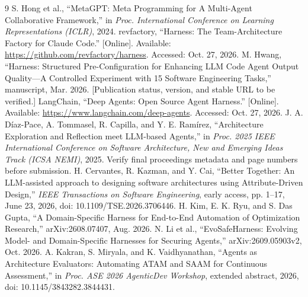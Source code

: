 \documentclass[10pt,conference]{IEEEtran}
\begin{document}
\begin{thebibliography}{9}
 S. Hong et al., ``MetaGPT: Meta Programming for A Multi-Agent Collaborative Framework,'' in \emph{Proc. International Conference on Learning Representations (ICLR)}, 2024.
 revfactory, ``Harness: The Team-Architecture Factory for Claude Code.'' [Online]. Available: \url{https://github.com/revfactory/harness}. Accessed: Oct. 27, 2026.
 M. Hwang, ``Harness: Structured Pre-Configuration for Enhancing LLM Code Agent Output Quality---A Controlled Experiment with 15 Software Engineering Tasks,'' manuscript, Mar. 2026. [Publication status, version, and stable URL to be verified.]
 LangChain, ``Deep Agents: Open Source Agent Harness.'' [Online]. Available: \url{https://www.langchain.com/deep-agents}. Accessed: Oct. 27, 2026.
 J. A. D\'iaz-Pace, A. Tommasel, R. Capilla, and Y. E. Ram\'irez, ``Architecture Exploration and Reflection meet LLM-based Agents,'' in \emph{Proc. 2025 IEEE International Conference on Software Architecture, New and Emerging Ideas Track (ICSA NEMI)}, 2025. Verify final proceedings metadata and page numbers before submission.
 H. Cervantes, R. Kazman, and Y. Cai, ``Better Together: An LLM-assisted approach to designing software architectures using Attribute-Driven Design,'' \emph{IEEE Transactions on Software Engineering}, early access, pp. 1--17, June 23, 2026, doi: 10.1109/TSE.2026.3706446.
 H. Kim, E. K. Ryu, and S. Das Gupta, ``A Domain-Specific Harness for End-to-End Automation of Optimization Research,'' arXiv:2608.07407, Aug. 2026.
 N. Li et al., ``EvoSafeHarness: Evolving Model- and Domain-Specific Harnesses for Securing Agents,'' arXiv:2609.05903v2, Oct. 2026.
 A. Kakran, S. Miryala, and K. Vaidhyanathan, ``Agents as Architecture Evaluators: Automating ATAM and SAAM for Continuous Assessment,'' in \emph{Proc. ASE 2026 AgenticDev Workshop}, extended abstract, 2026, doi: 10.1145/3843282.3844431.
\end{thebibliography}
\end{document}

